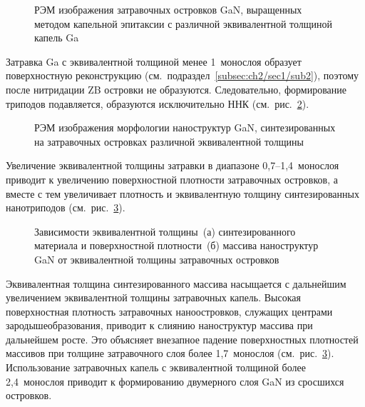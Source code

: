 \begin{figure}[ht] 
			\caption{РЭМ изображения затравочных островков GaN, выращенных методом
				капельной эпитаксии с различной эквивалентной толщиной капель
		Ga}\label{fig:Image_20} \end{figure}

Затравка Ga с эквивалентной толщиной менее 1~монослоя образует поверхностную
реконструкцию (см.~подраздел~\cref{subsec:ch2/sec1/sub2}), поэтому после
нитридации ZB островки не образуются. Следовательно, формирование триподов
подавляется, образуются исключительно ННК (см.~рис.~\cref{fig:Image_21}).

\begin{figure}[ht] 
			 \caption{РЭМ
				изображения морфологии наноструктур GaN, синтезированных на затравочных
				островках различной эквивалентной толщины}\label{fig:Image_21}
			\end{figure}

Увеличение эквивалентной толщины затравки в диапазоне 0,7--1,4~монослоя
приводит к увеличению поверхностной плотности затравочных островков, а вместе с
тем увеличивает плотность и эквивалентную толщину синтезированных нанотриподов
(см.~рис.~\cref{fig:Image_22}).

\begin{figure}[ht] 
			\caption{Зависимости эквивалентной толщины~(а) синтезированного материала
				и поверхностной плотности~(б) массива наноструктур GaN от эквивалентной
				толщины затравочных островков}\label{fig:Image_22} \end{figure}

Эквивалентная толщина синтезированного массива насыщается с дальнейшим
увеличением эквивалентной толщины затравочных капель. Высокая поверхностная
плотность затравочных наноостровков, служащих центрами зародышеобразования,
приводит к слиянию наноструктур массива при дальнейшем росте. Это объясняет
внезапное падение поверхностных плотностей массивов при толщине затравочного
слоя более 1,7~монослоя (см.~рис.~\cref{fig:Image_22}). Использование
затравочных капель с эквивалентной толщиной более 2,4~монослоя приводит к
формированию двумерного слоя GaN из сросшихся островков.

